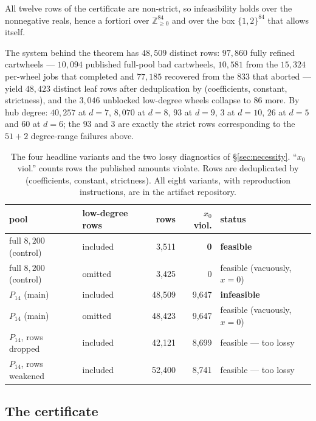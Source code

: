 \documentclass[11pt]{article}
\theoremstyle{definition}
\begin{document}
All twelve rows of the certificate are non-strict, so infeasibility holds over
the nonnegative reals, hence a fortiori over $\mathbb{Z}^{84}_{\ge0}$ and over
the box $\{1,2\}^{84}$ that \cite{nl4ct2026} allows itself.

The system behind the theorem has $48{,}509$ distinct rows: $97{,}860$ fully
refined cartwheels --- $10{,}094$ published full-pool bad cartwheels, $10{,}581$
from the $15{,}324$ per-wheel jobs that completed and $77{,}185$ recovered from
the $833$ that aborted --- yield $48{,}423$ distinct leaf rows after
deduplication by (coefficients, constant, strictness), and the $3{,}046$
unblocked low-degree wheels collapse to $86$ more. By hub degree: $40{,}257$ at
$d=7$, $8{,}070$ at $d=8$, $93$ at $d=9$, $3$ at $d=10$, $26$ at $d=5$ and $60$
at $d=6$; the $93$ and $3$ are exactly the strict rows corresponding to the
$51+2$ degree-range failures above.

\begin{table}[t]
\centering\small
\caption{The four headline variants and the two lossy diagnostics of
\S\ref{sec:necessity}. ``$x_0$ viol.'' counts rows the published amounts violate.
Rows are deduplicated by (coefficients, constant, strictness). All eight variants,
with reproduction instructions, are in the artifact repository.}
\label{tab:variants}
\begin{tabular}{llrrl}
\toprule
pool & low-degree rows & rows & $x_0$ viol. & status \\
\midrule
full $8{,}200$ (control) & included & 3{,}511 & \textbf{0} & \textbf{feasible} \\
full $8{,}200$ (control) & omitted  & 3{,}425 & 0 & feasible (vacuously, $x=0$) \\
$P_{14}$ (main)          & included & 48{,}509 & 9{,}647 & \textbf{infeasible} \\
$P_{14}$ (main)          & omitted  & 48{,}423 & 9{,}647 & feasible (vacuously, $x=0$) \\
\midrule
$P_{14}$, rows dropped   & included & 42{,}121 & 8{,}699 & feasible --- too lossy \\
$P_{14}$, rows weakened  & included & 52{,}400 & 8{,}741 & feasible --- too lossy \\
\bottomrule
\end{tabular}
\end{table}

\subsection{The certificate}
\label{sec:cert}
\end{document}

